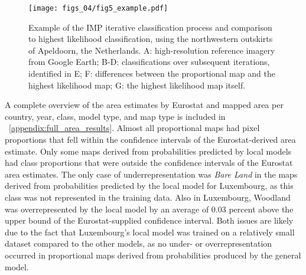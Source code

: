     \begin{figure}[H]
        \centering
        \texttt{[image: figs\_04/fig5\_example.pdf]}
        \caption{Example of the IMP iterative classification process and comparison to highest likelihood classification, using the northwestern outskirts of Apeldoorn, the Netherlands. A: high-resolution reference imagery from Google Earth; B-D: classifications over subsequent iterations, identified in E; F: differences between  the proportional map and the highest likelihood map; G: the highest likelihood map itself.}
        \label{fig:map_example}
    \end{figure}

    A complete overview of the area estimates by Eurostat and mapped area per country, year, class, model type, and map type is included in ~\ref{appendix:full_area_results}. Almost all proportional maps had pixel proportions that fell within the confidence intervals of the Eurostat-derived area estimate. Only some maps derived from probabilities predicted by local models had class proportions that were outside the confidence intervals of the Eurostat area estimates. The only case of underrepresentation was \textit{Bare Land} in the maps derived from probabilities predicted by the local model for Luxembourg, as this class was not represented in the training data. Also in Luxembourg, Woodland was overrepresented by the local model by an average of 0.03 percent above the upper bound of the Eurostat-supplied confidence interval. Both issues are likely due to the fact that Luxembourg's local model was trained on a relatively small dataset compared to the other models, as no under- or overrepresentation occurred in proportional maps derived from probabilities produced by the general model.

